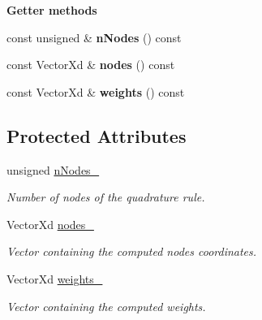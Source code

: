 \begin{Indent}{\bf Getter methods}\par
\begin{DoxyCompactItemize}
\item 
\hypertarget{classQuadratureRule_a1fe4b7cc4dd74cd606cd56e169b20895}{const unsigned \& {\bfseries n\-Nodes} () const }\label{classQuadratureRule_a1fe4b7cc4dd74cd606cd56e169b20895}

\item 
\hypertarget{classQuadratureRule_a3e83db6b0a26aa35fa94d592c2c5426c}{const Vector\-Xd \& {\bfseries nodes} () const }\label{classQuadratureRule_a3e83db6b0a26aa35fa94d592c2c5426c}

\item 
\hypertarget{classQuadratureRule_ad03df86d720dadce277cd07fe460d8ee}{const Vector\-Xd \& {\bfseries weights} () const }\label{classQuadratureRule_ad03df86d720dadce277cd07fe460d8ee}

\end{DoxyCompactItemize}
\end{Indent}
\subsection*{Protected Attributes}
\begin{DoxyCompactItemize}
\item 
\hypertarget{classQuadratureRule_a8f4bb43717322579edc12974700aec98}{unsigned \hyperlink{classQuadratureRule_a8f4bb43717322579edc12974700aec98}{n\-Nodes\-\_\-}}\label{classQuadratureRule_a8f4bb43717322579edc12974700aec98}

\begin{DoxyCompactList}\small\item\em Number of nodes of the quadrature rule. \end{DoxyCompactList}\item 
\hypertarget{classQuadratureRule_a62ad07fa140bcc39af00e04b045dd341}{Vector\-Xd \hyperlink{classQuadratureRule_a62ad07fa140bcc39af00e04b045dd341}{nodes\-\_\-}}\label{classQuadratureRule_a62ad07fa140bcc39af00e04b045dd341}

\begin{DoxyCompactList}\small\item\em Vector containing the computed nodes coordinates. \end{DoxyCompactList}\item 
\hypertarget{classQuadratureRule_a092f514241565ee4a925e654b331dbf6}{Vector\-Xd \hyperlink{classQuadratureRule_a092f514241565ee4a925e654b331dbf6}{weights\-\_\-}}\label{classQuadratureRule_a092f514241565ee4a925e654b331dbf6}

\begin{DoxyCompactList}\small\item\em Vector containing the computed weights. \end{DoxyCompactList}\end{DoxyCompactItemize}

